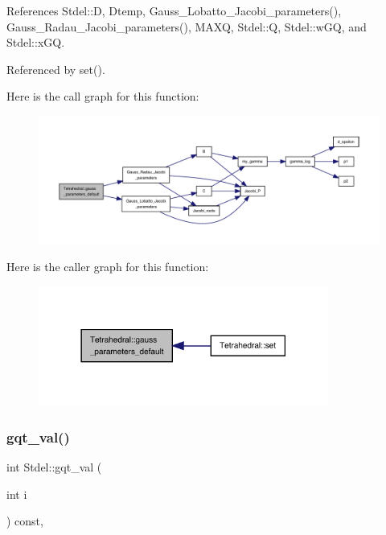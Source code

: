 References Stdel\+::D, Dtemp, Gauss\+\_\+\+Lobatto\+\_\+\+Jacobi\+\_\+parameters(), Gauss\+\_\+\+Radau\+\_\+\+Jacobi\+\_\+parameters(), M\+A\+XQ, Stdel\+::Q, Stdel\+::w\+GQ, and Stdel\+::x\+GQ.



Referenced by set().

Here is the call graph for this function\+:
\nopagebreak
\begin{figure}[H]
\begin{center}
\leavevmode
\includegraphics[width=350pt]{classTetrahedral_af21ac1b16603e912b6a9530475f42efa_cgraph}
\end{center}
\end{figure}
Here is the caller graph for this function\+:
\nopagebreak
\begin{figure}[H]
\begin{center}
\leavevmode
\includegraphics[width=270pt]{classTetrahedral_af21ac1b16603e912b6a9530475f42efa_icgraph}
\end{center}
\end{figure}
\mbox{\label{classStdel_a0775d0c4f7f15ae26bd45fc949e6f6b9}} 
\subsubsection{\texorpdfstring{gqt\+\_\+val()}{gqt\_val()}}
{\footnotesize\ttfamily int Stdel\+::gqt\+\_\+val (\begin{DoxyParamCaption}\item[{int}]{i }\end{DoxyParamCaption}) const\hspace{0.3cm}{\ttfamily [inline]}, {\ttfamily [inherited]}}



